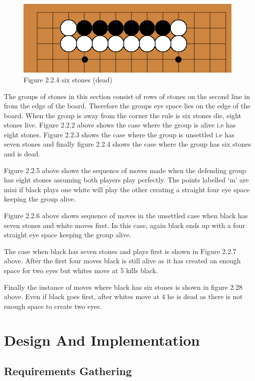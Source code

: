 \documentclass{l3proj}
\begin{document}
\begin{figure}[H]
\centering
\includegraphics[scale=0.5]{Images/sixdie.png}
\caption{Figure 2.2.4 six stones (dead)}
\end{figure}

The groups of stones in this section consist of rows of stones on the second line in from the edge of the board.  Therefore the groups eye space lies on the edge of the board. When the group is away from the corner the rule is six stones die, eight stones live. Figure 2.2.2 above shows the case where the group is alive i.e has eight stones. Figure 2.2.3 shows the case where the group is unsettled i.e has seven stones and finally figure 2.2.4 shows the case where the group has six stones and is dead.

Figure 2.2.5 above shows the sequence of moves made when the defending group has eight stones assuming both players play perfectly. The points labelled ‘m’ are miai if black plays one white will play the other creating a straight four eye space keeping the group alive.

Figure 2.2.6 above shows sequence of moves in the unsettled case when black has seven stones and white moves first.  In this case, again black ends up with a four straight eye space keeping the group alive.

The case when black has seven stones and plays first is shown in Figure 2.2.7 above. After the first four moves black is still alive as it has created an enough space for two eyes but whites move at 5 kills black.

Finally the instance of moves where black has six stones is shown in figure 2.28 above. Even if black goes first, after whites move at 4 he is dead as there is not enough space to create two eyes.

\chapter{Design And Implementation}
\label{design}

\section{Requirements Gathering}
\end{document}
